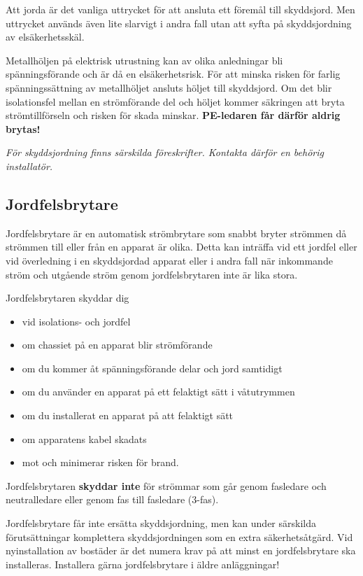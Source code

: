 Att jorda är det vanliga uttrycket för att ansluta ett föremål till
skyddsjord. Men uttrycket används även lite slarvigt i andra fall utan att
syfta på skyddsjordning av elsäkerhetsskäl.

Metallhöljen på elektrisk utrustning kan av olika anledningar bli
spänningsförande och är då en elsäkerhetsrisk. För att minska risken för
farlig spänningssättning av metallhöljet ansluts höljet till skyddsjord.
Om det blir isolationsfel mellan en strömförande del och höljet kommer
säkringen att bryta strömtillförseln och risken för skada minskar.
\textbf{PE-ledaren får därför aldrig brytas!}

\emph{För skyddsjordning finns särskilda föreskrifter. Kontakta därför en
behörig installatör.}

\subsection{Jordfelsbrytare}

Jordfelsbrytare är en automatisk strömbrytare som snabbt bryter strömmen
då strömmen till eller från en apparat är olika. Detta kan inträffa vid
ett jordfel eller vid överledning i en skyddsjordad apparat eller i andra
fall när inkommande ström och utgående ström genom jordfelsbrytaren inte
är lika stora.

Jordfelsbrytaren skyddar dig
\begin{itemize}
\item vid isolations- och jordfel
\item om chassiet på en apparat blir strömförande
\item om du kommer åt spänningsförande delar och jord samtidigt
\item om du använder en apparat på ett felaktigt sätt i våtutrymmen
\item om du installerat en apparat på att felaktigt sätt
\item om apparatens kabel skadats
\item mot och minimerar risken för brand.
\end{itemize}

Jordfelsbrytaren \textbf{skyddar inte} för strömmar som går genom fasledare
och neutralledare eller genom fas till fasledare (3-fas).

Jordfelsbrytare får inte ersätta skyddsjordning, men kan under särskilda
förutsättningar komplettera skyddsjordningen som en extra säkerhetsåtgärd.
Vid nyinstallation av bostäder är det numera krav på att minst en
jordfelsbrytare ska installeras. Installera gärna jordfelsbrytare i äldre
anläggningar!

